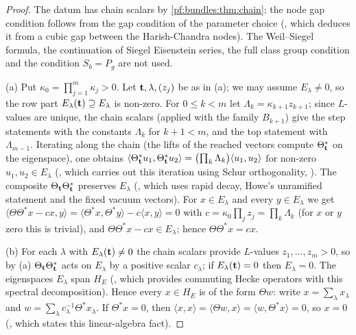 \begin{proof}
The datum has chain scalars by \cref{pf:bundles:thm:chain}; the node gap condition follows from the gap condition of the parameter choice
(, which deduces it from a cubic gap between the
Harish-Chandra nodes). The Weil--Siegel formula, the continuation of Siegel Eisenstein series, the full class group condition and the condition
$S_b=P_g$ are not used.

(a) Put $\kappa_0=\prod_{j=1}^m\kappa_j>0$. Let $\mathbf t,\lambda,(z_j)$ be as in (a); we may assume $E_\lambda\ne0$, so the row part
$E_\lambda(\mathbf t)\supseteq E_\lambda$ is non-zero. For $0\le k<m$ let $\Lambda_k=\kappa_{k+1}z_{k+1}$; since $L$-values are unique, the chain scalars
(applied with the family $B_{k+1}$) give the step statements with the constants $\Lambda_k$ for $k+1<m$, and the top statement with $\Lambda_{m-1}$.
Iterating along the chain (the lifts of the reached vectors compute $\Theta_\mathbf t^*$ on the eigenspace), one obtains
$\langle\Theta_\mathbf t^*u_1,\Theta_\mathbf t^*u_2\rangle=\bigl(\prod_k\Lambda_k\bigr)\langle u_1,u_2\rangle$ for non-zero $u_1,u_2\in E_\lambda$
(, which carries out this iteration using Schur orthogonality,
). The composite $\Theta_\mathbf t\Theta_\mathbf t^*$ preserves $E_\lambda$
(, which uses rapid decay, Howe's unramified statement and the fixed
vacuum vectors). For $x\in E_\lambda$ and every $y\in E_\lambda$ we get $\langle\Theta\Theta^*x-cx,y\rangle=\langle\Theta^*x,\Theta^*y\rangle-c\langle
x,y\rangle=0$ with $c=\kappa_0\prod_jz_j=\prod_k\Lambda_k$ (for $x$ or $y$ zero this is trivial), and $\Theta\Theta^*x-cx\in E_\lambda$; hence
$\Theta\Theta^*x=cx$.

(b) For each $\lambda$ with $E_\lambda(\mathbf t)\neq0$ the chain scalars provide $L$-values $z_1,\dots,z_m>0$, so by (a) $\Theta_\mathbf t\Theta_\mathbf t^*$
acts on $E_\lambda$ by a positive scalar $c_\lambda$; if $E_\lambda(\mathbf t)=0$ then $E_\lambda=0$. The eigenspaces $E_\lambda$ span $H_E$
(, which provides commuting Hecke operators with this spectral decomposition). Hence every
$x\in H_E$ is of the form $\Theta w$: write $x=\sum_\lambda x_\lambda$ and $w=\sum_\lambda c_\lambda^{-1}\Theta^*x_\lambda$. If $\Theta^*x=0$, then
$\langle x,x\rangle=\langle\Theta w,x\rangle=\langle w,\Theta^*x\rangle=0$, so $x=0$
(, which states this linear-algebra fact).
\end{proof}

